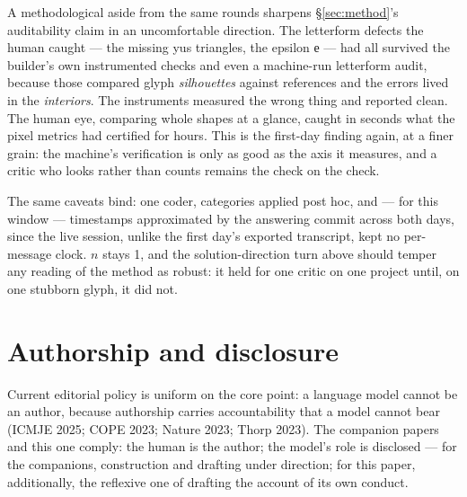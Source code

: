 \documentclass[11pt]{article}
\newcommand{\cz}[1]{{\chu #1}}
\begin{document}
A methodological aside from the same rounds sharpens \S\ref{sec:method}'s auditability claim in an uncomfortable direction. The letterform defects the human caught — the missing yus triangles, the epsilon \cz{е} — had all survived the builder's own instrumented checks and even a machine-run letterform audit, because those compared glyph \emph{silhouettes} against references and the errors lived in the \emph{interiors}. The instruments measured the wrong thing and reported clean. The human eye, comparing whole shapes at a glance, caught in seconds what the pixel metrics had certified for hours. This is the first-day finding again, at a finer grain: the machine's verification is only as good as the axis it measures, and a critic who looks rather than counts remains the check on the check.

The same caveats bind: one coder, categories applied post hoc, and — for this window — timestamps approximated by the answering commit across both days, since the live session, unlike the first day's exported transcript, kept no per-message clock. $n$ stays 1, and the solution-direction turn above should temper any reading of the method as robust: it held for one critic on one project until, on one stubborn glyph, it did not.

\section{Authorship and disclosure}\label{sec:authorship}

Current editorial policy is uniform on the core point: a language model cannot be an author, because authorship carries accountability that a model cannot bear (ICMJE 2025; COPE 2023; Nature 2023; Thorp 2023). The companion papers and this one comply: the human is the author; the model's role is disclosed — for the companions, construction and drafting under direction; for this paper, additionally, the reflexive one of drafting the account of its own conduct.
\end{document}
